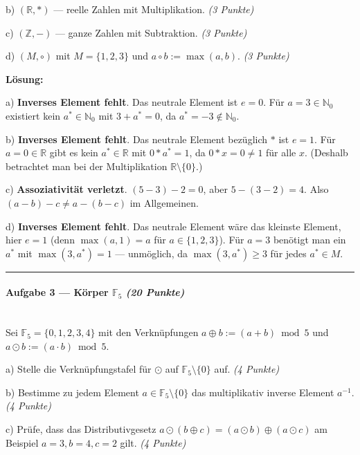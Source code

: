 \documentclass[11pt, a4paper]{article}
\begin{document}
b) $(\mathbb{R}, \ast)$ — reelle Zahlen mit Multiplikation. \textit{(3 Punkte)}


c) $(\mathbb{Z}, -)$ — ganze Zahlen mit Subtraktion. \textit{(3 Punkte)}


d) $(M, \circ)$ mit $M = \{1, 2, 3\}$ und $a \circ b := \max(a, b)$. \textit{(3 Punkte)}


\textbf{Lösung:}


a) \textbf{Inverses Element fehlt}. Das neutrale Element ist $e = 0$. Für $a = 3 \in \mathbb{N}_0$ existiert kein $a^* \in \mathbb{N}_0$ mit $3 + a^* = 0$, da $a^* = -3 \notin \mathbb{N}_0$.


b) \textbf{Inverses Element fehlt}. Das neutrale Element bezüglich $\ast$ ist $e = 1$. Für $a = 0 \in \mathbb{R}$ gibt es kein $a^* \in \mathbb{R}$ mit $0 \ast a^* = 1$, da $0 \ast x = 0 \neq 1$ für alle $x$. (Deshalb betrachtet man bei der Multiplikation $\mathbb{R} \setminus \{0\}$.)


c) \textbf{Assoziativität verletzt}. $(5 - 3) - 2 = 0$, aber $5 - (3 - 2) = 4$. Also $(a-b)-c \neq a-(b-c)$ im Allgemeinen.


d) \textbf{Inverses Element fehlt}. Das neutrale Element wäre das kleinste Element, hier $e = 1$ (denn $\max(a, 1) = a$ für $a \in \{1,2,3\}$). Für $a = 3$ benötigt man ein $a^*$ mit $\max(3, a^*) = 1$ — unmöglich, da $\max(3, a^*) \geq 3$ für jedes $a^* \in M$.



\noindent\textcolor{rulegray}{\rule{\linewidth}{0.4pt}}


\paragraph{Aufgabe 3 — Körper $\mathbb{F}_5$ \textit{(20 Punkte)}}\mbox{}\\[2pt]

Sei $\mathbb{F}_5 = \{0, 1, 2, 3, 4\}$ mit den Verknüpfungen $a \oplus b := (a+b) \bmod 5$ und $a \odot b := (a \cdot b) \bmod 5$.


a) Stelle die Verknüpfungstafel für $\odot$ auf $\mathbb{F}_5 \setminus \{0\}$ auf. \textit{(4 Punkte)}


b) Bestimme zu jedem Element $a \in \mathbb{F}_5 \setminus \{0\}$ das multiplikativ inverse Element $a^{-1}$. \textit{(4 Punkte)}


c) Prüfe, dass das Distributivgesetz $a \odot (b \oplus c) = (a \odot b) \oplus (a \odot c)$ am Beispiel $a=3, b=4, c=2$ gilt. \textit{(4 Punkte)}
\end{document}
